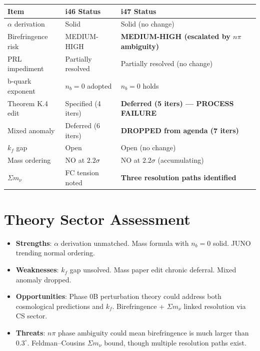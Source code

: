 \documentclass[11pt,a4paper]{article}
\begin{document}
\begin{center}
\begin{tabular}{lll}
\toprule
\textbf{Item} & \textbf{i46 Status} & \textbf{i47 Status} \\
\midrule
$\alpha$ derivation & Solid & Solid (no change) \\
Birefringence risk & MEDIUM-HIGH & \textbf{MEDIUM-HIGH (escalated by $n\pi$ ambiguity)} \\
PRL impediment & Partially resolved & Partially resolved (no change) \\
b-quark exponent & $n_b = 0$ adopted & $n_b = 0$ holds \\
Theorem K.4 edit & Specified (4 iters) & \textbf{Deferred (5 iters) --- PROCESS FAILURE} \\
Mixed anomaly & Deferred (6 iters) & \textbf{DROPPED from agenda (7 iters)} \\
$k_f$ gap & Open & Open (no change) \\
Mass ordering & NO at $2.2\sigma$ & NO at $2.2\sigma$ (accumulating) \\
$\Sigma m_\nu$ & FC tension noted & \textbf{Three resolution paths identified} \\
\bottomrule
\end{tabular}
\end{center}

\section{Theory Sector Assessment}

\begin{itemize}
\item \textbf{Strengths}: $\alpha$ derivation unmatched. Mass formula with $n_b = 0$ solid. JUNO trending normal ordering.
\item \textbf{Weaknesses}: $k_f$ gap unsolved. Mass paper edit chronic deferral. Mixed anomaly dropped.
\item \textbf{Opportunities}: Phase 0B perturbation theory could address both cosmological predictions and $k_f$. Birefringence + $\Sigma m_\nu$ linked resolution via CS sector.
\item \textbf{Threats}: $n\pi$ phase ambiguity could mean birefringence is much larger than $0.3^\circ$. Feldman--Cousins $\Sigma m_\nu$ bound, though multiple resolution paths exist.
\end{itemize}
\end{document}
